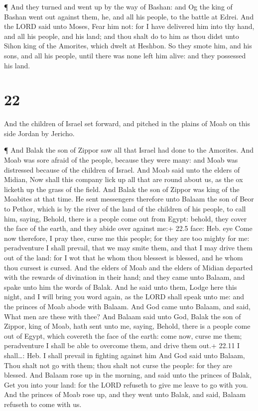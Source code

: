  ¶ And they turned and went up by the way of Bashan: and Og
the king of Bashan went out against them, he, and all his people, to the
battle at Edrei.  And the LORD said unto Moses, Fear him
not: for I have delivered him into thy hand, and all his people, and his
land; and thou shalt do to him as thou didst unto Sihon king of the
Amorites, which dwelt at Heshbon.  So they smote him, and
his sons, and all his people, until there was none left him alive: and
they possessed his land.

\hypertarget{section-21}{%
\section{22}\label{section-21}}

 And the children of Israel set forward, and pitched in the
plains of Moab on this side Jordan by Jericho.

 ¶ And Balak the son of Zippor saw all that Israel had done
to the Amorites.  And Moab was sore afraid of the people,
because they were many: and Moab was distressed because of the children
of Israel.  And Moab said unto the elders of Midian, Now
shall this company lick up all that are round about us, as the ox
licketh up the grass of the field. And Balak the son of Zippor was king
of the Moabites at that time.  He sent messengers therefore
unto Balaam the son of Beor to Pethor, which is by the river of the land
of the children of his people, to call him, saying, Behold, there is a
people come out from Egypt: behold, they cover the face of the earth,
and they abide over against me:+ 22.5 face: Heb. eye  Come
now therefore, I pray thee, curse me this people; for they are too
mighty for me: peradventure I shall prevail, that we may smite them, and
that I may drive them out of the land: for I wot that he whom thou
blessest is blessed, and he whom thou cursest is cursed. 
And the elders of Moab and the elders of Midian departed with the
rewards of divination in their hand; and they came unto Balaam, and
spake unto him the words of Balak.  And he said unto them,
Lodge here this night, and I will bring you word again, as the LORD
shall speak unto me: and the princes of Moab abode with Balaam.
 And God came unto Balaam, and said, What men are these with
thee?  And Balaam said unto God, Balak the son of Zippor,
king of Moab, hath sent unto me, saying,  Behold, there is
a people come out of Egypt, which covereth the face of the earth: come
now, curse me them; peradventure I shall be able to overcome them, and
drive them out.+ 22.11 I shall\ldots: Heb. I shall prevail in fighting
against him  And God said unto Balaam, Thou shalt not go
with them; thou shalt not curse the people: for they are blessed.
 And Balaam rose up in the morning, and said unto the
princes of Balak, Get you into your land: for the LORD refuseth to give
me leave to go with you.  And the princes of Moab rose up,
and they went unto Balak, and said, Balaam refuseth to come with us.


